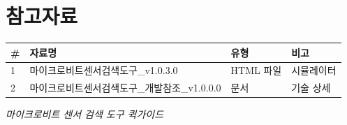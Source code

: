 \documentclass[11pt,a4paper]{article}
\begin{document}
\section*{참고자료}

\begin{center}
\renewcommand{\arraystretch}{1.4}
\begin{tabular}{|p{1.5cm}|p{9.1cm}|p{2.1cm}|p{2.3cm}|}
\hline
\rowcolor{tableheader}
\textbf{\#} & \textbf{자료명} & \textbf{유형} & \textbf{비고} \\
\hline
1 & 마이크로비트센서검색도구\_v1.0.3.0 & HTML 파일 & 시뮬레이터 \\
\hline
2 & 마이크로비트센서검색도구\_개발참조\_v1.0.0.0 & 문서 & 기술 상세 \\
\hline
\end{tabular}
\end{center}


\vfill
\begin{center}
\small\color{lightbrown}
\textit{마이크로비트 센서 검색 도구 퀵가이드}
\end{center}
\end{document}
